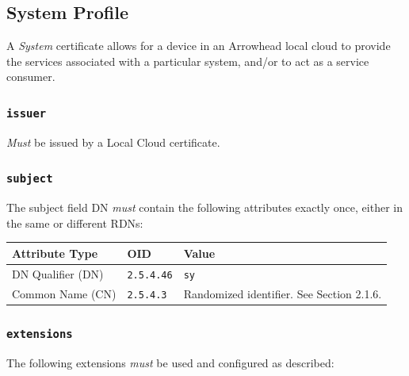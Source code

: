 \newpage
\subsection{System Profile}

A \textit{System} certificate allows for a device in an Arrowhead local cloud to provide the services associated with a particular system, and/or to act as a service consumer.

\subsubsection{\texttt{issuer}}

\textit{Must} be issued by a Local Cloud certificate.

\subsubsection{\texttt{subject}}

The subject field DN \textit{must} contain the following attributes exactly once, either in the same or different RDNs:

\vspace*{0.5cm}
\noindent\begin{tabularx}{\textwidth}{| p{4cm} | p{2cm} | X |} \hline
\rowcolor{gray!33} Attribute Type & OID               & Value \\ \hline

DN Qualifier (DN)                 & \texttt{2.5.4.46} & \texttt{sy} \\ \hline
Common Name (CN)                  & \texttt{2.5.4.3}  &  Randomized identifier. See Section 2.1.6. \\ \hline

\end{tabularx}
\vspace*{0.5cm}

\subsubsection{\texttt{extensions}}

The following extensions \textit{must} be used and configured as described:

